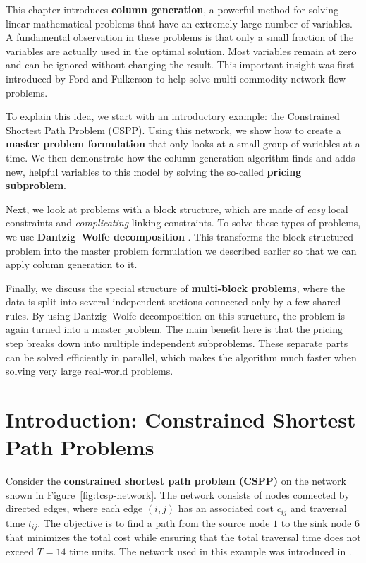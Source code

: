 \documentclass{book}
\theoremstyle{definition}
\newcounter{algorithm_}
\numberwithin{algorithm_}{chapter}
\begin{document}
This chapter introduces \textbf{column generation}, a powerful method for solving linear mathematical problems that have an extremely large number of variables. A fundamental observation in these problems is that only a small fraction of the variables are actually used in the optimal solution. Most variables remain at zero and can be ignored without changing the result. This important insight was first introduced by Ford and Fulkerson \cite{ford1958suggested} to help solve multi-commodity network flow problems.

\medskip

To explain this idea, we start with an introductory example: the Constrained Shortest Path Problem (CSPP). Using this network, we show how to create a \textbf{master problem formulation} that only looks at a small group of variables at a time. We then demonstrate how the column generation algorithm finds and adds new, helpful variables to this model by solving the so-called \textbf{pricing subproblem}.

\medskip

Next, we look at problems with a block structure, which are made of \textit{easy} local constraints and \textit{complicating} linking constraints. To solve these types of problems, we use \textbf{Dantzig--Wolfe decomposition} \cite{dantzig1960decomposition}. This transforms the block-structured problem into the master problem formulation we described earlier so that we can apply column generation to it.

\medskip

Finally, we discuss the special structure of \textbf{multi-block problems}, where the data is split into several independent sections connected only by a few shared rules. By using Dantzig--Wolfe decomposition on this structure, the problem is again turned into a master problem. The main benefit here is that the pricing step breaks down into multiple independent subproblems. These separate parts can be solved efficiently in parallel, which makes the algorithm much faster when solving very large real-world problems.

\vspace*{\fill}

\newpage


\section{Introduction: Constrained Shortest Path Problems} \label{sec:introduction}

Consider the \textbf{constrained shortest path problem (CSPP)} on the network shown in Figure~\ref{fig:tcsp-network}. 
The network consists of nodes connected by directed edges, where each edge $(i,j)$ has an associated cost $c_{ij}$ and traversal time $t_{ij}$. 
The objective is to find a path from the source node $1$ to the sink node $6$ that minimizes the total cost while ensuring that the total traversal time does not exceed $T = 14$ time units. The network used in this example was introduced in \cite{Desrosiers2005}.
\end{document}
